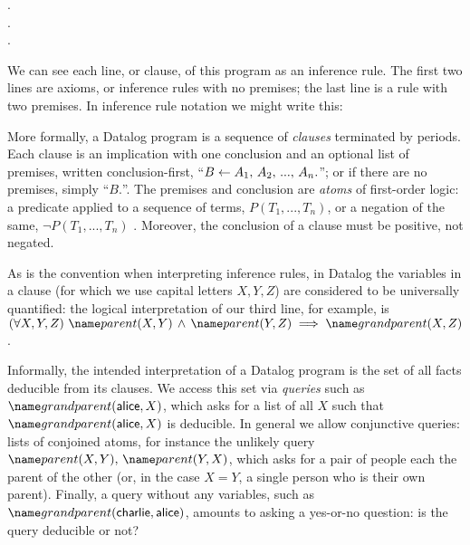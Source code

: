 \begin{datalog}
  .
  \\
  .
  \\
   \gets {} \conj {}.
\end{datalog}

\noindent
We can see each line, or clause, of this program as an inference rule. The first
two lines are axioms, or inference rules with no premises; the last line is a
rule with two premises. In inference rule notation we might write this:
%
\begin{mathpar}


\end{mathpar}

\noindent
More formally, a Datalog program is a sequence of \emph{clauses} terminated by
periods. Each clause is an implication with one conclusion and an optional list
of premises, written conclusion-first, ``$B \gets A_1 \conj A_2 \conj ... \conj
A_n.$''; or if there are no premises, simply ``$B.$''. The premises and
conclusion are \emph{atoms} of first-order logic: a predicate applied to a
sequence of terms, $P(T_1, ..., T_n)$, or a negation of the same, $\neg P(T_1,
..., T_n)$%
.
%
%
Moreover, the conclusion of a clause must be positive, not negated.
%

As is the convention when interpreting inference rules, in Datalog the variables
in a clause (for which we use capital letters $X,Y,Z$) are considered to be
universally quantified: the logical interpretation of our third line, for
example, is $\fa{X, Y, Z} \atom{parent}{X, Y} \wedge \atom{parent}{Y, Z}
\implies \atom{grandparent}{X, Z}$.

Informally, the intended interpretation of a Datalog program is the set of all
facts deducible from its clauses.
%
We access this set via \emph{queries} such as
$\atom{grandparent}{\datum{alice},X}$, which asks for a list of all $X$ such
that $\atom{grandparent}{\datum{alice},X}$ is deducible. In general we allow
conjunctive queries: lists of conjoined atoms, for instance the unlikely query
$\atom{parent}{X,Y} \conj \atom{parent}{Y,X}$, which asks for a pair of people
each the parent of the other (or, in the case $X = Y$, a single person who is
their own parent). Finally, a query without any variables, such as
$\atom{grandparent}{\datum{charlie}, \datum{alice}}$, amounts to asking a
yes-or-no question: is the query deducible or not?

